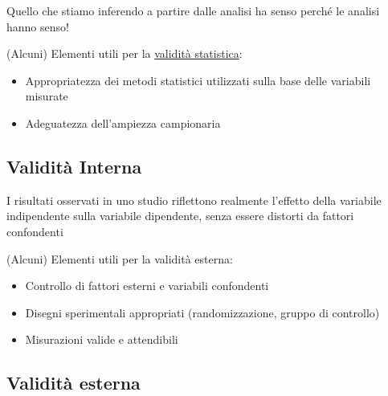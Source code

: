 \documentclass[compress]{beamer}
\begin{document}
\begin{frame}
	Quello che stiamo inferendo a partire dalle analisi ha senso perché le analisi hanno senso! 
	
	(Alcuni) Elementi utili per la \underline{validità statistica}:
	\begin{itemize}
		\item Appropriatezza dei metodi statistici utilizzati sulla base delle variabili misurate
		\item Adeguatezza dell'ampiezza campionaria
	\end{itemize} 
	
%	
\end{frame}

\subsection{Validità Interna}

\begin{frame}
	I risultati osservati in uno studio riflettono realmente l’effetto della variabile indipendente sulla variabile dipendente, senza essere distorti da fattori confondenti
	
	(Alcuni) Elementi utili per la validità esterna: 
	
	\begin{itemize}
		\item Controllo di fattori esterni e variabili confondenti
		
	\item 	Disegni sperimentali appropriati (randomizzazione, gruppo di controllo)
		
		\item 		Misurazioni valide e attendibili
	\end{itemize}
\end{frame}

\subsection{Validità esterna}
\end{document}

